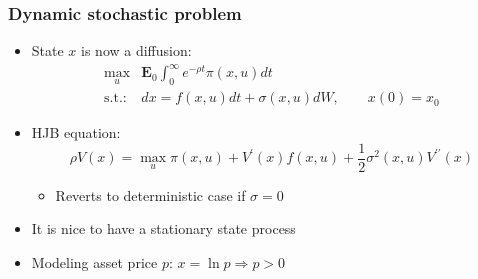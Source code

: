 \documentclass[bigger,handout]{beamer}
\begin{document}
\begin{frame}%
\frametitle{Dynamic stochastic problem}

\begin{itemize}
\item State $x$ is now a diffusion:%
\begin{equation*}
\begin{array}{rl}
\max_{u} & \mathbf{E}_{0}\int_{0}^{\infty }e^{-\rho t}\pi \left( x,u\right)
dt \\
\text{s.t.:} & dx=f\left( x,u\right) dt+\sigma \left( x,u\right) dW,\qquad
x(0)=x_{0}%
\end{array}%
\end{equation*}

\item HJB equation:%
\begin{equation*}
\rho V(x)=\max_{u}\pi \left( x,u\right) +V^{\prime }(x)f(x,u)+\frac{1}{2}%
\sigma ^{2}\left( x,u\right) V^{\prime \prime }\left( x\right)
\end{equation*}

\begin{itemize}
\item Reverts to deterministic case if $\sigma =0$
\end{itemize}

\item It is nice to have a stationary state process

\item Modeling asset price $p$: $x=\ln p\Rightarrow p>0$
\end{itemize}

\end{frame}%
\end{document}
